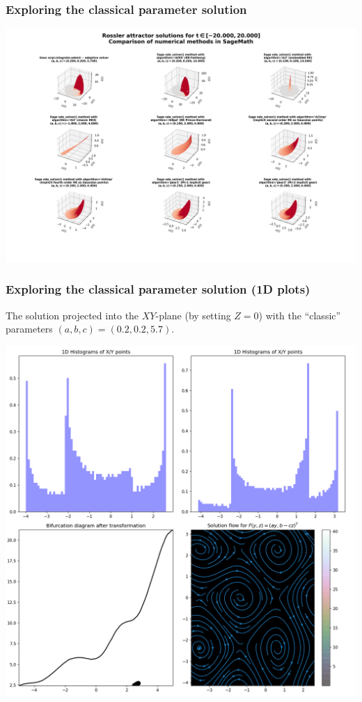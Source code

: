 \documentclass[usenames,svgnames,dvipsnames,10pt]{beamer}
\begin{document}
\begin{frame}[fragile]
\frametitle{Exploring the classical parameter solution}

\begin{center}
\vskip -0.5cm
\includegraphics[height=0.92\textheight]{../Images/RosslerAttractorSage3DSolvers-2021-10-29-081641.png}
\end{center}

\end{frame}

\begin{frame}[fragile]
\frametitle{Exploring the classical parameter solution (1D plots)}

The solution projected into the $XY$-plane (by setting $Z=0$) with the ``classic'' 
parameters $(a, b, c) = (0.2, 0.2, 5.7)$. \\ 
\begin{center}
\includegraphics[height=0.75\textheight]{../Images/RosslerAttractorSummary-TypeXY-Plot1D-A0-200B0-200C5-700-2021-10-27-044726.png}
\end{center}

\end{frame}
\end{document}
